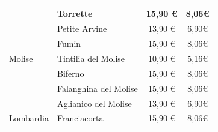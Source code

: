 \documentclass[12pt, a4paper]{article}
\begin{document}
\begin{longtable}{@{}|l|l|c|c|}
                         & Torrette                                                                  & 15,90 €                                                         & 8,06€                                                                                                         \\ \hline
                         & Petite Arvine                                                             & 13,90 €                                                         & 6,90€                                                                                                         \\ \hline
                         & Fumin                                                                     & 15,90 €                                                         & 8,06€                                                                                                         \\ \hline
    Molise               & Tintilia del Molise                                                       & 10,90 €                                                         & 5,16€                                                                                                         \\ \hline
                         & Biferno                                                                   & 15,90 €                                                         & 8,06€                                                                                                         \\ \hline
                         & Falanghina del Molise                                                     & 15,90 €                                                         & 8,06€                                                                                                         \\ \hline
                         & Aglianico del Molise                                                      & 13,90 €                                                         & 6,90€                                                                                                         \\ \hline
    Lombardia            & Franciacorta                                                              & 15,90 €                                                         & 8,06€                                                                                                         \\ \hline

\end{longtable}
\end{document}
